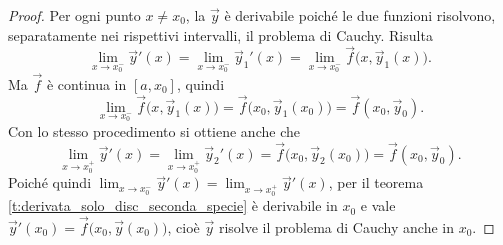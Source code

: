 \begin{proof}
	Per ogni punto $x\neq x_0$, la $\vec y$ è derivabile poiché le due funzioni risolvono, separatamente nei rispettivi intervalli, il problema di Cauchy.
	Risulta
	\begin{equation}
		\lim_{x\to x_0^-}\vec y'(x)=\lim_{x\to x_0^-}\vec y_1'(x)=\lim_{x\to x_0^-}\vec f\big(x,\vec y_1(x)\big).
	\end{equation}
	Ma $\vec f$ è continua in $[a,x_0]$, quindi 
	\begin{equation}
		\lim_{x\to x_0^-}\vec f\big(x,\vec y_1(x)\big)=\vec f\big(x_0,\vec y_1(x_0)\big)=\vec f(x_0,\vec y_0).
	\end{equation}
	Con lo stesso procedimento si ottiene anche che
	\begin{equation}
		\lim_{x\to x_0^+}\vec y'(x)=\lim_{x\to x_0^+}\vec y_2'(x)=\vec f\big(x_0,\vec y_2(x_0)\big)=\vec f(x_0,\vec y_0).
	\end{equation}
	Poiché quindi $\lim_{x\to x_0^-}\vec y'(x)=\lim_{x\to x_0^+}\vec y'(x)$, per il teorema \ref{t:derivata_solo_disc_seconda_specie} è derivabile in $x_0$ e vale $\vec y'(x_0)=\vec f\big(x_0,\vec y(x_0)\big)$, cioè $\vec y$ risolve il problema di Cauchy anche in $x_0$.
\end{proof}

